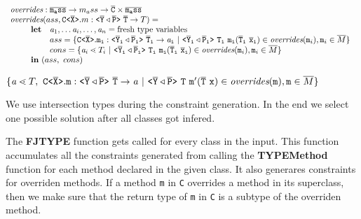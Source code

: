 \documentclass[a4paper,USenglish,cleveref, autoref, thm-restate]{lipics-v2021}
\begin{document}
$\begin{array}{l}
\overridesFunc : \ol{m_ass} \to m_ass \to \consSet \times \ol{m_ass} \\
\overridesFunc(ass, \exptype{C}{\ol{X}}.m : \exptype{}{\ol{Y} \triangleleft \ol{P}}\ \ol{T} \to T) = \\
\quad \quad \begin{array}{ll}
\textbf{let}& \tv{a}_1, \ldots \tv{a}_i, \ldots, \tv{a}_n = \text{fresh type variables} \\
& ass = \set{ \exptype{C}{\ol{X}}.\mathtt{m_i} : \mathtt{\exptype{}{\ol{Y}_i \triangleleft \ol{P}_i}\ \ol{T}_i \to \tv{a}_i}
\ |\ \mathtt{\exptype{}{\ol{Y}_i \triangleleft \ol{P}_i}\ T_i\ m_i(\ol{T}_i\ \ol{x}_i)} \in \overridesFunc(\mathtt{m}_i), \mathtt{m}_i \in \overline{M}} \\
& cons = \set{ \tv{a}_i \lessdot T_i \ |\ \mathtt{\exptype{}{\ol{Y}_i \triangleleft \ol{P}_i}\ T_i\ m_i(\ol{T}_i\ \ol{x}_i)} \in \overridesFunc(\mathtt{m}_i), \mathtt{m}_i \in \overline{M}} \\
\multicolumn{2}{l}{\textbf{in}\ (ass,\ cons)} \\
\end{array}\\
\end{array}
$

$\{  \mathit{ a } \lessdot T ,\ \mathtt{C \texttt{<} \overline{\tt X} \texttt{>} }.\mathtt{m} : \mathtt{\mathtt{ \texttt{<} \overline{\tt Y} \triangleleft \overline{\tt P} \texttt{>} }\ \overline{\tt T} \to \mathit{ a }}
\ |\ \mathtt{\mathtt{ \texttt{<} \overline{\tt Y} \triangleleft \overline{\tt P} \texttt{>} }\ T\ m'(\overline{\tt T}\ x)} \in \textit{overrides}(\mathtt{m}), \mathtt{m} \in \overline{M} \}$

We use intersection types during the constraint generation.
In the end we select one possible solution after all classes got infered.

The \textbf{FJTYPE} function gets called for every class in the input.
This function accumulates all the constraints generated from calling the
\textbf{TYPEMethod} function for each method declared in the given class.
It also generares constraints for overriden methods.
If a method \texttt{m} in \texttt{C} overrides a method in its superclass,
then we make sure that the return type of \texttt{m} in \texttt{C} is a subtype of the overriden method.
\end{document}
